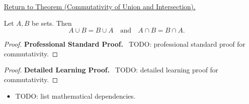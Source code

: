 \newpage
{}
\label{prf:commutativity}

\begin{remark*}[Return]
\hyperref[thm:commutativity]{Return to Theorem (Commutativity of Union and Intersection).}
\end{remark*}

\begin{theorem*}
Let $A,B$ be sets. Then
\[
A \cup B = B \cup A
\quad\text{and}\quad
A \cap B = B \cap A.
\]
\end{theorem*}

\begin{proof}
\textbf{Professional Standard Proof.}~
TODO: professional standard proof for commutativity.
\end{proof}

\begin{proof}
\textbf{Detailed Learning Proof.}~
TODO: detailed learning proof for commutativity.
\end{proof}

\begin{remark*}
\end{remark*}

\begin{dependencies}
\begin{itemize}
  \item TODO: list mathematical dependencies.
\end{itemize}
\end{dependencies}

\clearpage
